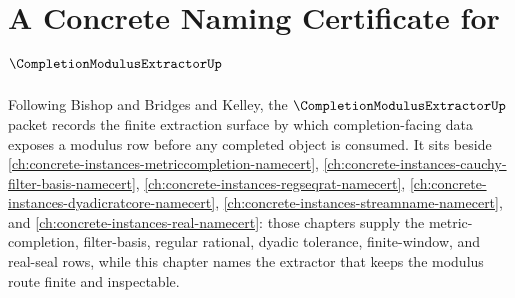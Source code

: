 \chapter{A Concrete Naming Certificate for $\CompletionModulusExtractorUp$}
\label{ch:concrete-instances-completion-modulus-extractor-namecert}

Following Bishop and Bridges and Kelley, the $\CompletionModulusExtractorUp$ packet records the finite extraction surface by which completion-facing data exposes a modulus row before any completed object is consumed. It sits beside \autoref{ch:concrete-instances-metriccompletion-namecert}, \autoref{ch:concrete-instances-cauchy-filter-basis-namecert}, \autoref{ch:concrete-instances-regseqrat-namecert}, \autoref{ch:concrete-instances-dyadicratcore-namecert}, \autoref{ch:concrete-instances-streamname-namecert}, and \autoref{ch:concrete-instances-real-namecert}: those chapters supply the metric-completion, filter-basis, regular rational, dyadic tolerance, finite-window, and real-seal rows, while this chapter names the extractor that keeps the modulus route finite and inspectable.

